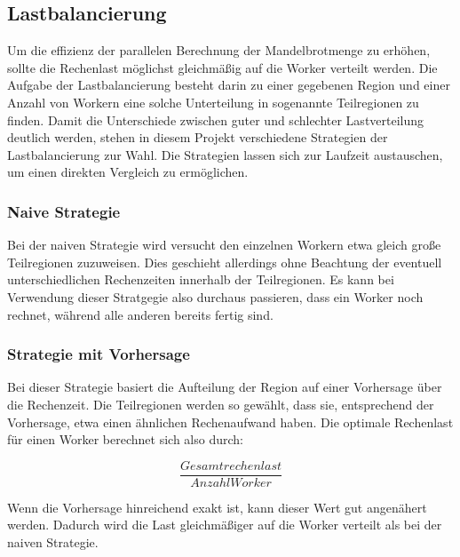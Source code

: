 \subsection{Lastbalancierung}\label{sec:load_balancing_concepts}

Um die effizienz der parallelen Berechnung der Mandelbrotmenge zu erhöhen, sollte die Rechenlast möglichst gleichmäßig auf die Worker verteilt werden.
Die Aufgabe der Lastbalancierung besteht darin zu einer gegebenen Region und einer Anzahl von Workern eine solche Unterteilung in sogenannte Teilregionen zu finden.
Damit die Unterschiede zwischen guter und schlechter Lastverteilung deutlich werden, stehen in diesem Projekt verschiedene Strategien der Lastbalancierung zur Wahl.
Die Strategien lassen sich zur Laufzeit austauschen, um einen direkten Vergleich zu ermöglichen.

\subsubsection{Naive Strategie}

Bei der naiven Strategie wird versucht den einzelnen Workern etwa gleich große Teilregionen zuzuweisen.
Dies geschieht allerdings ohne Beachtung der eventuell unterschiedlichen Rechenzeiten innerhalb der Teilregionen.
Es kann bei Verwendung dieser Stratgegie also durchaus passieren, dass ein Worker noch rechnet, während alle anderen bereits fertig sind.

\subsubsection{Strategie mit Vorhersage}

Bei dieser Strategie basiert die Aufteilung der Region auf einer Vorhersage über die Rechenzeit.
Die Teilregionen werden so gewählt, dass sie, entsprechend der Vorhersage, etwa einen ähnlichen Rechenaufwand haben.
Die optimale Rechenlast für einen Worker berechnet sich also durch:

\begin{equation}\label{equ:desiredN}
	\frac{Gesamtrechenlast}{AnzahlWorker}
\end{equation}

Wenn die Vorhersage hinreichend exakt ist, kann dieser Wert gut angenähert werden.
Dadurch wird die Last gleichmäßiger auf die Worker verteilt als bei der naiven Strategie.


